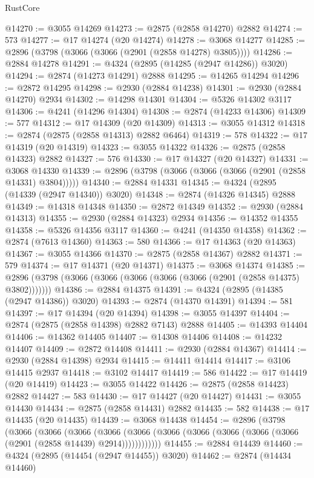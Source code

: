 \begin{lexlean}{RustCore}
\begin{coremodule}
@14270 := @3055 @14269
@14273 := @2875 (@2858 @14270) @2882
@14274 := 573
@14277 := @17 @14274 (@20 @14274)
@14278 := @3068 @14277
@14285 := @2896 (@3798 (@3066 (@3066 (@2901 (@2858 @14278) @3805))))
@14286 := @2884 @14278
@14291 := @4324 (@2895 (@14285 (@2947 @14286)) @3020)
@14294 := @2874 (@14273 @14291) @2888
@14295 := @14265 @14294
@14296 := @2872 @14295
@14298 := @2930 (@2884 @14238)
@14301 := @2930 (@2884 @14270) @2934
@14302 := @14298 @14301
@14304 := @5326 @14302 @3117
@14306 := @4241 (@14296 @14304)
@14308 := @2874 (@14233 @14306)
@14309 := 577
@14312 := @17 @14309 (@20 @14309)
@14313 := @3055 @14312
@14318 := @2874 (@2875 (@2858 @14313) @2882 @6464)
@14319 := 578
@14322 := @17 @14319 (@20 @14319)
@14323 := @3055 @14322
@14326 := @2875 (@2858 @14323) @2882
@14327 := 576
@14330 := @17 @14327 (@20 @14327)
@14331 := @3068 @14330
@14339 := @2896 (@3798 (@3066 (@3066 (@3066 (@2901 (@2858 @14331) @3804)))))
@14340 := @2884 @14331
@14345 := @4324 (@2895 (@14339 (@2947 @14340)) @3020)
@14348 := @2874 (@14326 @14345) @2888
@14349 := @14318 @14348
@14350 := @2872 @14349
@14352 := @2930 (@2884 @14313)
@14355 := @2930 (@2884 @14323) @2934
@14356 := @14352 @14355
@14358 := @5326 @14356 @3117
@14360 := @4241 (@14350 @14358)
@14362 := @2874 (@7613 @14360)
@14363 := 580
@14366 := @17 @14363 (@20 @14363)
@14367 := @3055 @14366
@14370 := @2875 (@2858 @14367) @2882
@14371 := 579
@14374 := @17 @14371 (@20 @14371)
@14375 := @3068 @14374
@14385 := @2896 (@3798 (@3066 (@3066 (@3066 (@3066 (@3066 (@2901 (@2858 @14375) @3802)))))))
@14386 := @2884 @14375
@14391 := @4324 (@2895 (@14385 (@2947 @14386)) @3020)
@14393 := @2874 (@14370 @14391)
@14394 := 581
@14397 := @17 @14394 (@20 @14394)
@14398 := @3055 @14397
@14404 := @2874 (@2875 (@2858 @14398) @2882 @7143) @2888
@14405 := @14393 @14404
@14406 := @14362 @14405
@14407 := @14308 @14406
@14408 := @14232 @14407
@14409 := @2872 @14408
@14411 := @2930 (@2884 @14367)
@14414 := @2930 (@2884 @14398) @2934
@14415 := @14411 @14414
@14417 := @3106 @14415 @2937
@14418 := @3102 @14417
@14419 := 586
@14422 := @17 @14419 (@20 @14419)
@14423 := @3055 @14422
@14426 := @2875 (@2858 @14423) @2882
@14427 := 583
@14430 := @17 @14427 (@20 @14427)
@14431 := @3055 @14430
@14434 := @2875 (@2858 @14431) @2882
@14435 := 582
@14438 := @17 @14435 (@20 @14435)
@14439 := @3068 @14438
@14454 := @2896
    (@3798
      (@3066
        (@3066
          (@3066
            (@3066 (@3066 (@3066 (@3066 (@3066 (@3066 (@3066 (@2901 (@2858 @14439) @2914))))))))))))
@14455 := @2884 @14439
@14460 := @4324 (@2895 (@14454 (@2947 @14455)) @3020)
@14462 := @2874 (@14434 @14460)

\end{coremodule}
\end{lexlean}
